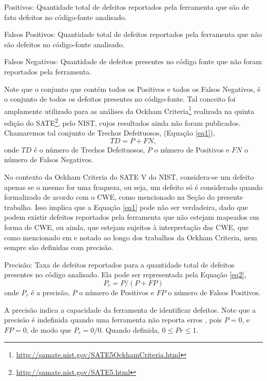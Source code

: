 Positivos: Quantidade total de defeitos reportados pela ferramenta que são de fato defeitos no código-fonte analisado.

Falsos Positivos: Quantidade total de defeitos reportados pela ferramenta que não são defeitos no código-fonte analisado.

Falsos Negativos: Quantidade de defeitos presentes no código fonte que não foram reportados pela ferramenta.

Note que o conjunto que contém todos os Positivos e todos os Falsos Negativos, é o conjunto de todos os defeitos presentes no código-fonte. Tal conceito foi amplamente utilizado para as análises da Ockham Criteria\footnote{\url{http://samate.nist.gov/SATE5OckhamCriteria.html}} realizada na quinta edição do SATE\footnote{\url{http://samate.nist.gov/SATE5.html}}, pelo NIST, cujos resultados ainda não foram publicados. Chamaremos tal conjunto de Trechos Defeituosos, (Equação \eqref{eq1}),
\begin{equation}\label{eq1}
TD = P + FN,
\end{equation}
  onde $TD$ é o número de Trechos Defeituosos, $P$ o número de Positivos e $FN$ o número de Falsos Negativos.

  No contexto da Ockham Criteria do SATE V do NIST, considera-se um defeito apenas se o mesmo for uma fraqueza, ou seja, um defeito só é considerado quando formalizado de acordo com o CWE, como mencionado   na Seção  do presente trabalho. Isso implica que a Equação \eqref{eq1} pode não ser verdadeira, dado que podem existir defeitos reportados pela ferramenta que não estejam mapeados em forma de CWE, ou ainda, que estejam sujeitos à interpretação das CWE, que como mencionado em \cite{yan} e notado ao longo dos trabalhos  da Ockham Criteria, nem sempre são definidas com precisão.

  Precisão: Taxa de defeitos reportados para a quantidade total de defeitos presentes no código analisado.  Ela pode ser representada pela Equação \eqref{eq2},
\begin{equation}\label{eq2}
  P_r = P / (P + FP)
\end{equation}
  onde $P_r$ é a precisão, $P$ o número de Positivos e $FP$ o número de Falsos Positivos.

  A precisão indica a capacidade da ferramenta de identificar defeitos. Note que a precisão é indefinida quando uma ferramenta não reporta erros \cite{nsa}, pois $P = 0$, e $FP = 0$, de modo que $P_r = 0/0$. Quando definida, $0 \leq Pr \leq 1$.

